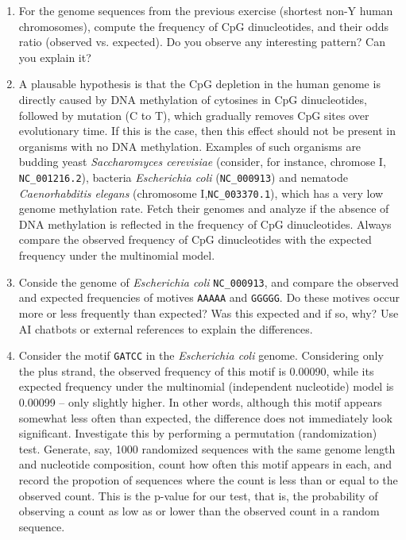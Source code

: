 \begin{enumerate}
\item For the genome sequences from the previous exercise (shortest non-Y human chromosomes), compute the frequency of CpG dinucleotides, and their odds ratio (observed vs. expected). Do you observe any interesting pattern? Can you explain it?

\item A plausable hypothesis is that the CpG depletion in the human genome is directly caused by DNA methylation of cytosines in CpG dinucleotides, followed by mutation (C to T), which gradually removes CpG sites over evolutionary time. If this is the case, then this effect should not be present in organisms with no DNA methylation. Examples of such organisms are budding yeast \textit{Saccharomyces cerevisiae} (consider, for instance, chromose I, \texttt{NC\_001216.2}), bacteria \textit{Escherichia coli} (\texttt{NC\_000913}) and nematode \textit{Caenorhabditis elegans} (chromosome I,\texttt{NC\_003370.1}), which has a very low genome methylation rate. Fetch their genomes and analyze if the absence of DNA methylation is reflected in the frequency of CpG dinucleotides. Always compare the observed frequency of CpG dinucleotides with the expected frequency under the multinomial model.

\item Conside the genome of \textit{Escherichia coli} \texttt{NC\_000913}, and compare the observed and expected frequencies of motives \texttt{AAAAA} and \texttt{GGGGG}. Do these motives occur more or less frequently than expected? Was this expected and if so, why? Use AI chatbots or external references to explain the differences.

\item Consider the motif \texttt{GATCC} in the \textit{Escherichia coli} genome. Considering only the plus strand, the observed frequency of this motif is 0.00090, while its expected frequency under the multinomial (independent nucleotide) model is 0.00099 – only slightly higher. In other words, although this motif appears somewhat less often than expected, the difference does not immediately look significant. Investigate this by performing a permutation (randomization) test. Generate, say, 1000 randomized sequences with the same genome length and nucleotide composition, count how often this motif appears in each, and record the propotion of sequences where the count is less than or equal to the observed count. This is the p-value for our test, that is, the probability of observing a count as low as or lower than the observed count in a random sequence.
\end{enumerate}



